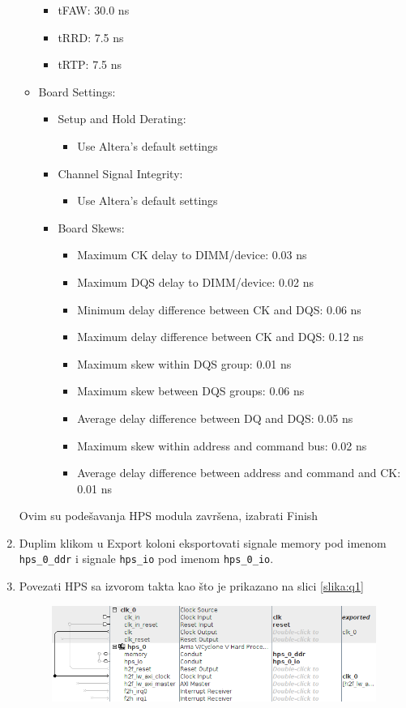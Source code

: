 \begin{enumerate}
\begin{itemize}
\begin{itemize}
\item		tFAW: 30.0 ns
\item		tRRD: 7.5 ns
\item		tRTP: 7.5 ns
\end{itemize}
\item	Board Settings:
\begin{itemize}
\item		Setup and Hold Derating:
\begin{itemize}
\item			Use Altera's default settings
\end{itemize}
\item		Channel Signal Integrity:
\begin{itemize}
\item			Use Altera's default settings
\end{itemize}
\item		Board Skews:
\begin{itemize}
\item			Maximum CK delay to DIMM/device: 0.03 ns
\item			Maximum DQS delay to DIMM/device: 0.02 ns
\item			Minimum delay difference between CK and DQS: 0.06 ns
\item			Maximum delay difference between CK and DQS: 0.12 ns
\item			Maximum skew within DQS group: 0.01 ns
\item			Maximum skew between DQS groups: 0.06 ns
\item			Average delay difference between DQ and DQS: 0.05 ns
\item			Maximum skew within address and command bus: 0.02 ns
\item			Average delay difference between address and command and CK: 0.01 ns
\end{itemize}
\end{itemize}
\end{itemize}
Ovim su podešavanja HPS modula završena, izabrati Finish
\item  Duplim klikom u Export koloni eksportovati signale memory pod imenom \texttt{hps\_0\_ddr} i signale \texttt{hps\_io} pod imenom \texttt{hps\_0\_io}.
\item  Povezati HPS sa izvorom takta kao što je prikazano na slici \ref{slika:q1}
\begin{figure}[h!]
\centering
\includegraphics[scale=0.9]{img/quartus1.png}

\end{figure}
\end{enumerate}
